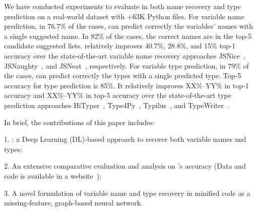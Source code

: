 We have conducted experiments to evaluate {\tool} in both name
recovery and type prediction on a real-world dataset with +63K Python
files. For variable name prediction, in 76.7\% of the cases, {\tool}
can predict correctly the variables' names with a single suggested
name. In 82\% of the cases, the correct names are in the top-5
candidate suggested lists. {\tool} relatively improves 40.7\%, 28.8\%,
and 15\% top-1 accuracy over the state-of-the-art variable name
recovery approaches JSNice~\cite{JSNice2015},
JSNaughty~\cite{JSNaughty2017}, and JSNeat~\cite{icse19},
respectively. For variable type prediction, in 79\% of the cases,
{\tool} can predict correctly the types with a single predicted type.
Top-5 accuracy for type prediction is 85\%. It relatively improves
XX\%--YY\% in top-1 accuracy and XX\%--YY\% in top-5 accuracy over the
state-of-the-art type prediction approaches HiTyper~\cite{yi},
Type4Py~\cite{yi}, Typilus~\cite{yi}, and TypeWriter~\cite{yi}.

In brief, the contributions of this paper includes:

1. {\bf {\tool}}: a Deep Learning (DL)-based approach to recover both
variable names and types;

2. An extensive comparative evaluation and analysis on {\tool}'s
accuracy (Data and code is available in a
website~\cite{deminify-website});

3. A novel formulation of variable name and type recovery in
minified code as a missing-feature, graph-based neural network.
